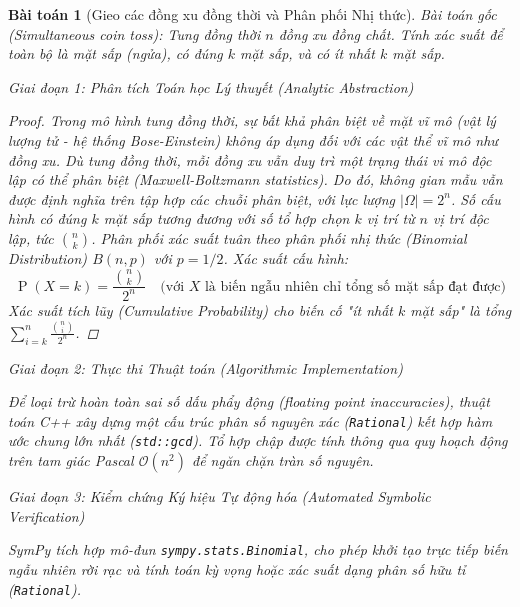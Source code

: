 \documentclass{article}
\newtheorem{baitoan}{Bài toán}
\begin{document}
\begin{baitoan}[Gieo các đồng xu đồng thời và Phân phối Nhị thức]
 \emph{Bài toán gốc (Simultaneous coin toss):} 
 Tung đồng thời $n$ đồng xu đồng chất. Tính xác suất để toàn bộ là mặt sấp (ngửa), có đúng $k$ mặt sấp, và có ít nhất $k$ mặt sấp.

\vspace{0.5em}\noindent\emph{Giai đoạn 1: Phân tích Toán học Lý thuyết (Analytic Abstraction)}
 
 \begin{proof}
 Trong mô hình tung đồng thời, sự bất khả phân biệt về mặt vĩ mô (vật lý lượng tử - hệ thống Bose-Einstein) không áp dụng đối với các vật thể vĩ mô như đồng xu. Dù tung đồng thời, mỗi đồng xu vẫn duy trì một trạng thái vi mô độc lập có thể phân biệt (Maxwell-Boltzmann statistics). Do đó, không gian mẫu vẫn được định nghĩa trên tập hợp các chuỗi phân biệt, với lực lượng $|\Omega| = 2^n$.
 Số cấu hình có đúng $k$ mặt sấp tương đương với số tổ hợp chọn $k$ vị trí từ $n$ vị trí độc lập, tức $\binom{n}{k}$.
 Phân phối xác suất tuân theo phân phối nhị thức (Binomial Distribution) $B(n, p)$ với $p=1/2$. Xác suất cấu hình:
 \begin{equation}
 \operatorname{P}(X = k) = \frac{\binom{n}{k}}{2^n} \quad \text{(với } X \text{ là biến ngẫu nhiên chỉ tổng số mặt sấp đạt được)}
 \end{equation}
 Xác suất tích lũy (Cumulative Probability) cho biến cố "ít nhất $k$ mặt sấp" là tổng $\sum_{i=k}^n \frac{\binom{n}{i}}{2^n}$.
 \end{proof}

\vspace{0.5em}\noindent\emph{Giai đoạn 2: Thực thi Thuật toán (Algorithmic Implementation)}
 
 Để loại trừ hoàn toàn sai số dấu phẩy động (floating point inaccuracies), thuật toán C++ xây dựng một cấu trúc phân số nguyên xác (\texttt{Rational}) kết hợp hàm ước chung lớn nhất (\texttt{std::gcd}). Tổ hợp chập được tính thông qua quy hoạch động trên tam giác Pascal $\mathcal{O}(n^2)$ để ngăn chặn tràn số nguyên.



\vspace{0.5em}\noindent\emph{Giai đoạn 3: Kiểm chứng Ký hiệu Tự động hóa (Automated Symbolic Verification)}
 
 \textsf{SymPy} tích hợp mô-đun \texttt{sympy.stats.Binomial}, cho phép khởi tạo trực tiếp biến ngẫu nhiên rời rạc và tính toán kỳ vọng hoặc xác suất dạng phân số hữu tỉ (\texttt{Rational}).


\end{baitoan}
\end{document}
